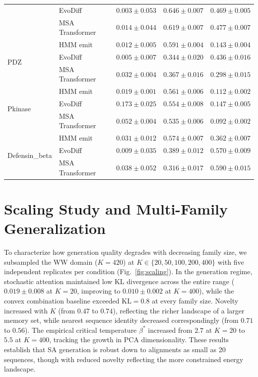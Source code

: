 \documentclass[10pt]{article}
\begin{document}
\begin{table}[ht]
\begin{tabular}{@{}llccc@{}}
 & EvoDiff         & $0.003 \pm 0.053$ & $0.646 \pm 0.007$ & $0.469 \pm 0.005$ \\
 & MSA Transformer & $0.014 \pm 0.044$ & $0.619 \pm 0.007$ & $0.477 \pm 0.007$ \\
\midrule
\multirow{3}{*}{PDZ}
 & HMM emit        & $0.012 \pm 0.005$ & $0.591 \pm 0.004$ & $0.143 \pm 0.004$ \\
 & EvoDiff         & $0.005 \pm 0.007$ & $0.344 \pm 0.020$ & $0.436 \pm 0.016$ \\
 & MSA Transformer & $0.032 \pm 0.004$ & $0.367 \pm 0.016$ & $0.298 \pm 0.015$ \\
\midrule
\multirow{3}{*}{Pkinase}
 & HMM emit        & $0.019 \pm 0.001$ & $0.561 \pm 0.006$ & $0.112 \pm 0.002$ \\
 & EvoDiff         & $0.173 \pm 0.025$ & $0.554 \pm 0.008$ & $0.147 \pm 0.005$ \\
 & MSA Transformer & $0.052 \pm 0.004$ & $0.535 \pm 0.006$ & $0.092 \pm 0.002$ \\
\midrule
\multirow{3}{*}{Defensin\_beta}
 & HMM emit        & $0.031 \pm 0.012$ & $0.574 \pm 0.007$ & $0.362 \pm 0.007$ \\
 & EvoDiff         & $0.009 \pm 0.035$ & $0.389 \pm 0.012$ & $0.570 \pm 0.009$ \\
 & MSA Transformer & $0.038 \pm 0.052$ & $0.316 \pm 0.017$ & $0.590 \pm 0.015$ \\
\bottomrule
\end{tabular}
\end{table}

\section{Scaling Study and Multi-Family Generalization}\label{si:scaling}

To characterize how generation quality degrades with decreasing family size, we subsampled the WW domain ($K{=}420$) at $K \in \{20, 50, 100, 200, 400\}$ with five independent replicates per condition (Fig.~\ref{fig:scaling}). In the generation regime, stochastic attention maintained low KL divergence across the entire range ($0.019 \pm 0.008$ at $K{=}20$, improving to $0.010 \pm 0.002$ at $K{=}400$), while the convex combination baseline exceeded $\mathrm{KL}{=}0.8$ at every family size. Novelty increased with $K$ (from $0.47$ to $0.74$), reflecting the richer landscape of a larger memory set, while nearest sequence identity decreased correspondingly (from $0.71$ to $0.56$). The empirical critical temperature $\beta^*$ increased from $2.7$ at $K{=}20$ to $5.5$ at $K{=}400$, tracking the growth in PCA dimensionality. These results establish that SA generation is robust down to alignments as small as 20 sequences, though with reduced novelty reflecting the more constrained energy landscape.
\end{document}
